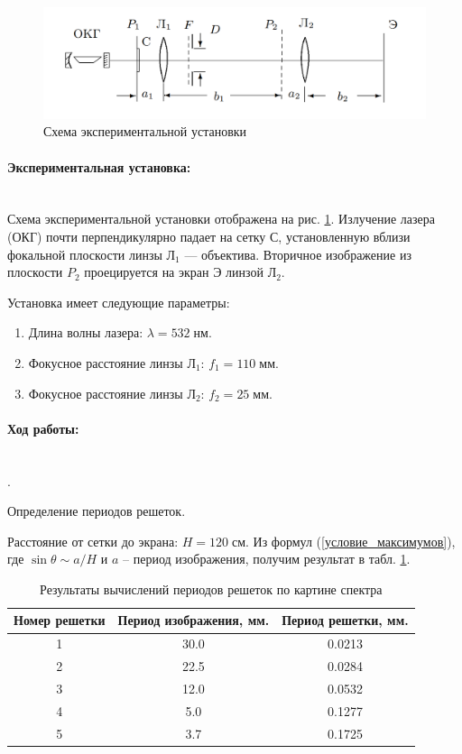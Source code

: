 \documentclass[a4paper, 12pt]{article}
\newcommand{\parag}[1]{\paragraph*{#1:}}
\newcounter{Points}
\newcommand{\point}{\arabic{Points}. \addtocounter{Points}{1}}
\begin{document}
\begin{figure}[tbp]
	\centering
	\includegraphics[width=0.8\linewidth]{Screenshot_3}
	\caption{Схема экспериментальной установки}
	\label{fig:screenshot3}
\end{figure}

\parag {Экспериментальная установка}~\\
Схема экспериментальной установки отображена на рис. \ref{fig:screenshot3}. Излучение лазера (ОКГ) почти перпендикулярно падает на сетку С, установленную вблизи фокальной плоскости линзы $ Л_1 $ — объектива. Вторичное изображение из плоскости $ P_2 $ проецируется на экран Э линзой $ Л_2 $.


Установка имеет следующие параметры:
\begin{enumerate}
    \item Длина волны лазера: $\lambda = 532 \; нм.$   
    \item Фокусное расстояние линзы $Л_1$: $f_1 = 110 \; мм.$
    \item Фокусное расстояние линзы $Л_2$: $f_2 = 25\; мм.$
\end{enumerate}

\parag {Ход работы} ~\\

\point Определение периодов решеток.

Расстояние от сетки до экрана: $H = 120 \; см.$ 
Из формул (\ref{условие_максимумов}), где $ \sin \theta \sim a / H $ и $ a $ -- период изображения, получим результат в табл. \ref{tabl:periods}.

\begin{table}[h]
\centering
\begin{tabular}{|c|c|c|}
\hline 
    Номер решетки & Период изображения, мм. & Период решетки, мм. \\ \hline
    1 & 30.0 & 0.0213 \\ \hline
    2 & 22.5 & 0.0284 \\ \hline
    3 & 12.0 & 0.0532 \\ \hline
    4 & 5.0 & 0.1277 \\ \hline
    5 & 3.7 & 0.1725 \\ \hline

\end{tabular}
\caption{Результаты вычислений периодов решеток по картине спектра}
\label{tabl:periods}
\end{table}
\end{document}
